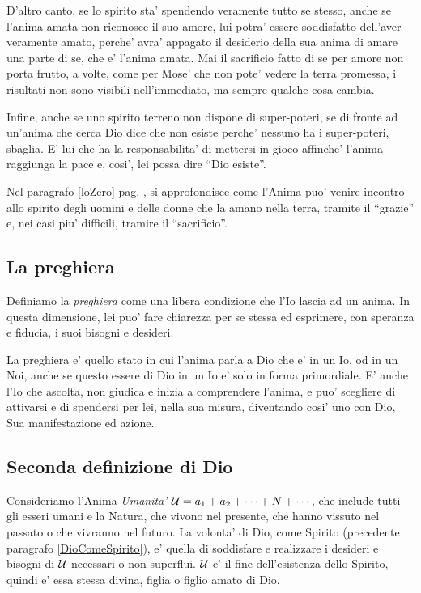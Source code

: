     D'altro canto, se lo spirito sta' spendendo veramente tutto se stesso, anche se l'anima amata non riconosce il suo amore, lui potra' essere soddisfatto dell'aver veramente amato, perche' avra' appagato il desiderio della sua anima di amare una parte di se, che e' l'anima amata. Mai il sacrificio fatto di se per amore non porta frutto, a volte, come per Mose' che non pote' vedere la terra promessa, i risultati non sono visibili nell'immediato, ma sempre qualche cosa cambia.

    Infine, anche se uno spirito terreno non dispone di super-poteri, se di fronte ad un'anima che cerca Dio dice che non esiste perche' nessuno ha i super-poteri, sbaglia. E' lui che ha la responsabilita' di mettersi in gioco affinche' l'anima raggiunga la pace e, cosi', lei possa dire ``Dio esiste''.

 Nel paragrafo \ref{loZero} pag. \pageref{loZero}, si approfondisce come l'Anima puo' venire incontro allo spirito degli uomini e delle donne che la amano nella terra, tramite il ``grazie'' e, nei casi piu' difficili, tramire il ``sacrificio''. 

\subsection{La preghiera}

Definiamo la \emph{preghiera} come una libera condizione che l'Io lascia ad un anima. In questa dimensione, lei puo' fare chiarezza per se stessa ed esprimere, con speranza e fiducia, i suoi bisogni e desideri. 

La preghiera e' quello stato in cui l'anima parla a Dio che e' in un Io, od in un Noi, anche se questo essere di Dio in un Io e' solo in forma primordiale. E' anche l'Io che ascolta, non giudica e inizia a comprendere l'anima, e puo' scegliere di attivarsi e di spendersi per lei, nella sua misura, diventando cosi' uno con Dio, Sua manifestazione ed azione.


\subsection{Seconda definizione di Dio}
\label{PureSoulAsGod}
\label{SecondaDefinizioneDio}

Consideriamo l'Anima \emph{Umanita'} $\mathcal{U}=a_1+a_2+\cdots+N+\cdots$, che include tutti gli esseri umani e la Natura, che vivono nel presente, che hanno vissuto nel passato o che vivranno nel futuro. La volonta' di Dio, come Spirito (precedente paragrafo \ref{DioComeSpirito}), e' quella di soddisfare e realizzare i desideri e bisogni di $\mathcal{U}$ necessari o non superflui. $\mathcal{U}$ e' il fine dell'esistenza dello Spirito, quindi e' essa stessa divina, figlia o figlio amato di Dio. 

